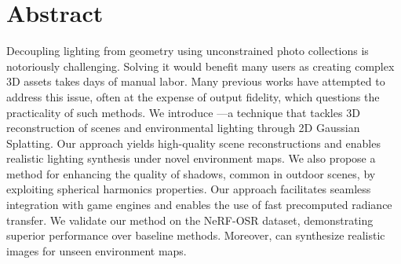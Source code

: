 \section{Abstract}
  Decoupling lighting from geometry using unconstrained photo collections is
  notoriously challenging.
  Solving it would benefit many users as creating complex 3D assets takes days
  of manual labor.
  Many previous works have attempted to address this issue, often at the
  expense of output fidelity, which questions the practicality of such
  methods.
  We introduce \lumigauss---a technique that tackles 3D reconstruction of
  scenes and environmental lighting through 2D Gaussian Splatting.
  Our approach yields high-quality scene reconstructions and enables realistic
  lighting synthesis under novel environment maps.
  We also propose a method for enhancing the quality of shadows, common in
  outdoor scenes, by exploiting spherical harmonics properties.
  Our approach facilitates seamless integration with game engines and enables
  the use of fast precomputed radiance transfer.
  We validate our method on the NeRF-OSR dataset, demonstrating superior
  performance over baseline methods.
  Moreover, \lumigauss can synthesize realistic images for unseen environment
  maps.
